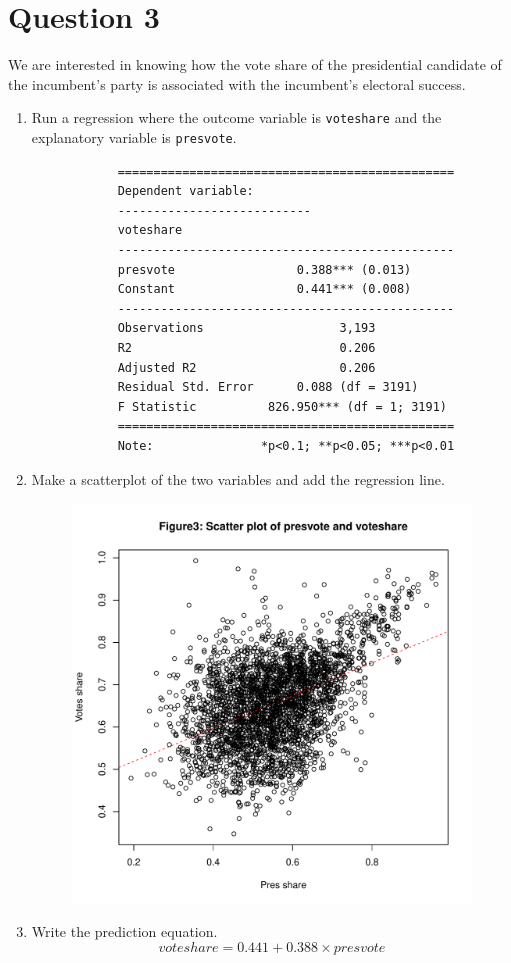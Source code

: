 \documentclass[12pt,letterpaper]{article}
\begin{document}
\section*{Question 3}

\noindent We are interested in knowing how the vote share of the presidential candidate of the incumbent's party is associated with the incumbent's electoral success.
	\vspace{.25cm}
	\begin{enumerate}
		\item Run a regression where the outcome variable is \texttt{voteshare} and the explanatory variable is \texttt{presvote}.
		
		\begin{verbatim}
			===============================================
			Dependent variable:    
			---------------------------
			voteshare         
			-----------------------------------------------
			presvote                 0.388*** (0.013)      
			Constant                 0.441*** (0.008)      
			-----------------------------------------------
			Observations                   3,193           
			R2                             0.206           
			Adjusted R2                    0.206           
			Residual Std. Error      0.088 (df = 3191)     
			F Statistic          826.950*** (df = 1; 3191) 
			===============================================
			Note:               *p<0.1; **p<0.05; ***p<0.01
		\end{verbatim}  

		\item Make a scatterplot of the two variables and add the regression line. 
		 
		\begin{figure}[H]
			\centering
			\includegraphics[width=.55\textwidth]{Q3_2_scatterplot.pdf}
		\end{figure}
		
		\item Write the prediction equation.
		\begin{equation*}
			voteshare = 0.441 + 0.388 \times presvote
		\end{equation*}
		
	\end{enumerate}
	
\end{document}
